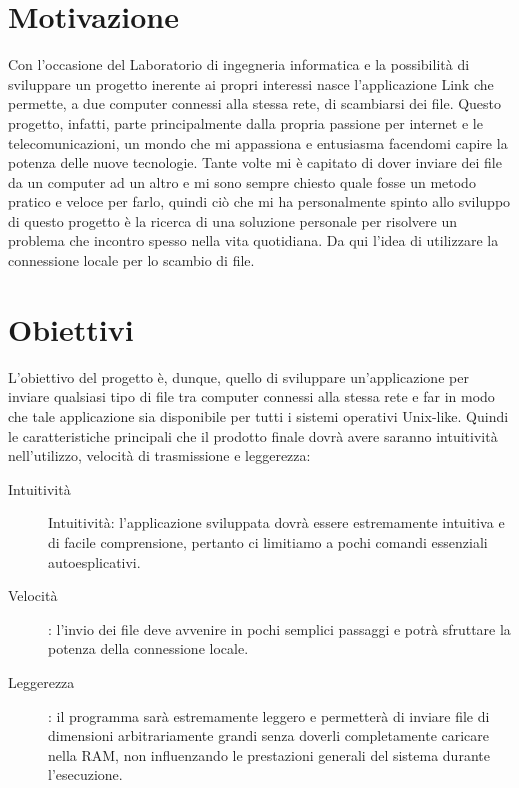 \documentclass[11pt,fleqn]{book} %
\begin{document}
\section{Motivazione}

Con l'occasione del Laboratorio di ingegneria informatica e la possibilità di sviluppare un progetto inerente ai propri interessi nasce l'applicazione Link che permette, a due computer connessi alla stessa rete, di scambiarsi dei file.
Questo progetto, infatti, parte principalmente dalla propria passione per internet e le telecomunicazioni, un mondo che mi appassiona e entusiasma facendomi capire la potenza delle nuove tecnologie.
Tante volte mi è capitato di dover inviare dei file da un computer ad un altro e mi sono sempre chiesto quale fosse un metodo pratico e veloce per farlo, quindi ciò che mi ha personalmente spinto allo sviluppo di questo progetto è la ricerca di una soluzione personale per risolvere un problema che incontro spesso nella vita quotidiana.
Da qui l'idea di utilizzare la connessione locale per lo scambio di file.

\section{Obiettivi}


L'obiettivo del progetto è, dunque, quello di sviluppare un'applicazione per inviare qualsiasi tipo di file tra computer connessi alla stessa rete e far in modo che tale applicazione sia disponibile per tutti i sistemi operativi Unix-like.
Quindi le caratteristiche principali che il prodotto finale dovrà avere saranno intuitività nell'utilizzo, velocità di trasmissione e leggerezza:

\begin{description}
\item[Intuitività] Intuitività: l'applicazione sviluppata dovrà essere estremamente intuitiva e di facile comprensione, pertanto ci limitiamo a pochi comandi essenziali autoesplicativi.
\item [Velocità]: l'invio dei file deve avvenire in pochi semplici passaggi e potrà sfruttare la potenza della connessione locale.
\item [Leggerezza]: il programma sarà estremamente leggero e permetterà di inviare file di dimensioni arbitrariamente grandi senza doverli completamente caricare nella RAM, non influenzando le prestazioni generali del sistema durante l'esecuzione.
\end{description}
\end{document}
